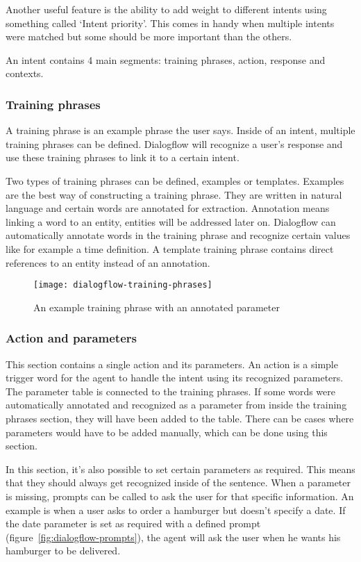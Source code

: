 Another useful feature is the ability to add weight to different intents using something called `Intent priority'. This comes in handy when multiple intents were matched but some should be more important than the others.

An intent contains 4 main segments: training phrases, action, response and contexts.

\subsubsection{Training phrases}

A training phrase is an example phrase the user says. Inside of an intent, multiple training phrases can be defined. Dialogflow will recognize a user's response and use these training phrases to link it to a certain intent.

Two types of training phrases can be defined, examples or templates. Examples are the best way of constructing a training phrase. They are written in natural language and certain words are annotated for extraction. Annotation means linking a word to an entity, entities will be addressed later on. Dialogflow can automatically annotate words in the training phrase and recognize certain values like for example a time definition. A template training phrase contains direct references to an entity instead of an annotation.

\begin{figure}[ht]
	\centering
	\texttt{[image: dialogflow-training-phrases]}
	\caption{An example training phrase with an annotated parameter}
	\label{fig:dialogflow-training-phrases}
\end{figure}

\subsubsection{Action and parameters}

This section contains a single action and its parameters. An action is a simple trigger word for the agent to handle the intent using its recognized parameters. The parameter table is connected to the training phrases. If some words were automatically annotated and recognized as a parameter from inside the training phrases section, they will have been added to the table. There can be cases where parameters would have to be added manually, which can be done using this section.

In this section, it's also possible to set certain parameters as required. This means that they should always get recognized inside of the sentence. When a parameter is missing, prompts can be called to ask the user for that specific information. An example is when a user asks to order a hamburger but doesn't specify a date. If the date parameter is set as required with a defined prompt (figure~\ref{fig:dialogflow-prompts}), the agent will ask the user when he wants his hamburger to be delivered.

